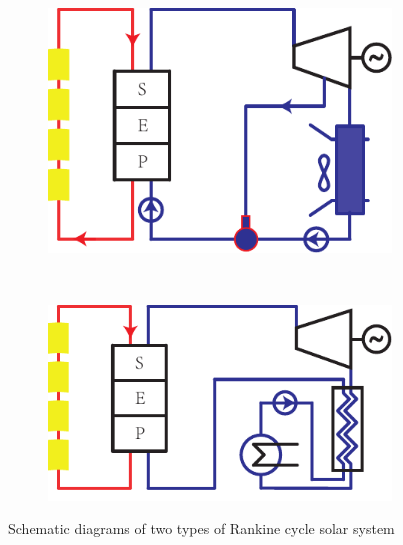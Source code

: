 \noindent \begin{figure}[htbp]
\centering
	\begin{subfigure}[b]{0.4\columnwidth}
	\includegraphics[width = \columnwidth]{fig/TypicalSteamRankineSolarSystem}
	\caption{}\label{fig:TypicalSteamRankineSolarSystem}
	\end{subfigure}
	~
\begin{subfigure}[b]{0.4\columnwidth}
	\includegraphics[width = \columnwidth]{fig/TypicalOrganicRankineSolarSystem}
	\caption{}\label{fig:TypicalOrganicRankineSolarSystem}
	\end{subfigure}
	\caption{Schematic diagrams of two types of Rankine cycle solar system}
	\label{fig:air-water}
\end{figure}


